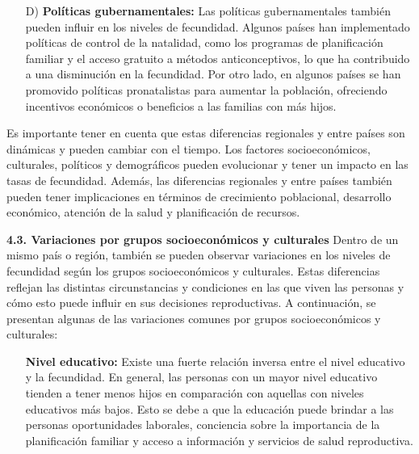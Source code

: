 \documentclass[8pt,a4paper]{beamer}
\begin{document}
{\begin{frame}{}
\begin{block}{}
\setlength{\parskip}{3px}
\justifying
\begin{enumerate}
\setlength{\parskip}{3px}
\justifying
\item[D)] \textbf{Políticas gubernamentales:} Las políticas gubernamentales también pueden influir en los niveles de fecundidad. Algunos países han implementado políticas de control de la natalidad, como los programas de planificación familiar y el acceso gratuito a métodos anticonceptivos, lo que ha contribuido a una disminución en la fecundidad. Por otro lado, en algunos países se han promovido políticas pronatalistas para aumentar la población, ofreciendo incentivos económicos o beneficios a las familias con más hijos.
\end{enumerate}
Es importante tener en cuenta que estas diferencias regionales y entre países son dinámicas y pueden cambiar con el tiempo. Los factores socioeconómicos, culturales, políticos y demográficos pueden evolucionar y tener un impacto en las tasas de fecundidad. Además, las diferencias regionales y entre países también pueden tener implicaciones en términos de crecimiento poblacional, desarrollo económico, atención de la salud y planificación de recursos.
\end{block}
\end{frame}

\begin{frame}{}
\begin{block}{\textbf{4.3. Variaciones por grupos socioeconómicos y culturales}}
\setlength{\parskip}{3px}
\justifying
Dentro de un mismo país o región, también se pueden observar variaciones en los niveles de fecundidad según los grupos socioeconómicos y culturales. Estas diferencias reflejan las distintas circunstancias y condiciones en las que viven las personas y cómo esto puede influir en sus decisiones reproductivas. A continuación, se presentan algunas de las variaciones comunes por grupos socioeconómicos y culturales:

\begin{enumerate}
\setlength{\parskip}{3px}
\justifying
\item[\ding{102}] \textbf{Nivel educativo:} Existe una fuerte relación inversa entre el nivel educativo y la fecundidad. En general, las personas con un mayor nivel educativo tienden a tener menos hijos en comparación con aquellas con niveles educativos más bajos. Esto se debe a que la educación puede brindar a las personas oportunidades laborales, conciencia sobre la importancia de la planificación familiar y acceso a información y servicios de salud reproductiva.


\end{enumerate}
\end{block}
\end{frame}}
\end{document}
